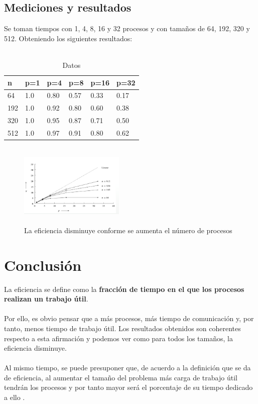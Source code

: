 \documentclass[10pt,twocolumn,a4paper]{article}
\begin{document}
\subsection{Mediciones y resultados}
Se toman tiempos con 1, 4, 8, 16 y 32 procesos y con tamaños de 64, 192, 320 y 512. Obteniendo los siguientes resultados: \\ \\

\begin{table}[H]
\begin{center}
\begin{tabular}{|l l l l l l|}
\hline
n&p=1&p=4&p=8&p=16&p=32\\
\hline
\hline
64		&1.0		&0.80	&0.57	&0.33	&0.17\\
192		&1.0		&0.92	&0.80	&0.60	&0.38\\ 
320		&1.0		&0.95	&0.87	&0.71	&0.50\\ 
512		&1.0		&0.97	&0.91	&0.80	&0.62\\ 
\hline
\end{tabular}
\caption{Datos}
\label{Tabla de datos}
\end{center}
\end{table}

\begin{figure}[H]
\begin{center}
\includegraphics[height=4cm, width=5cm]{grafico}
\caption{La eficiencia disminuye conforme se aumenta el número de procesos}
\end{center}
\end{figure}

\section{Conclusión}
La eficiencia se define como la \textbf{fracción de tiempo en el que los procesos realizan un trabajo útil}.\\ \\
Por ello, es obvio pensar que a más procesos, más tiempo de comunicación y, por tanto, menos tiempo de trabajo útil. Los resultados obtenidos son coherentes respecto a esta afirmación y podemos ver como para todos los tamaños, la eficiencia disminuye.\\ \\
Al mismo tiempo, se puede presuponer que, de acuerdo a la definición que se da de eficiencia, al aumentar el tamaño del problema más carga de trabajo útil tendrán los procesos y por tanto mayor  será el porcentaje de su tiempo dedicado a ello .


\end{document}
